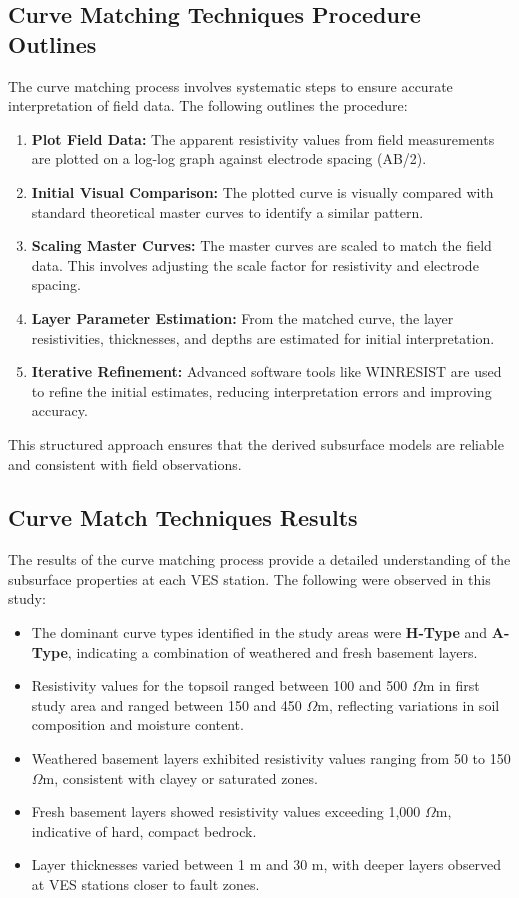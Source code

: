 \documentclass[12pt,a4paper]{report}
\begin{document}
\subsection{Curve Matching Techniques Procedure Outlines}

The curve matching process involves systematic steps to ensure accurate interpretation of field data. The following outlines the procedure:

\begin{enumerate}
    \item \textbf{Plot Field Data:} The apparent resistivity values from field measurements are plotted on a log-log graph against electrode spacing (AB/2).
    \item \textbf{Initial Visual Comparison:} The plotted curve is visually compared with standard theoretical master curves to identify a similar pattern.
    \item \textbf{Scaling Master Curves:} The master curves are scaled to match the field data. This involves adjusting the scale factor for resistivity and electrode spacing.
    \item \textbf{Layer Parameter Estimation:} From the matched curve, the layer resistivities, thicknesses, and depths are estimated for initial interpretation.
    \item \textbf{Iterative Refinement:} Advanced software tools like WINRESIST are used to refine the initial estimates, reducing interpretation errors and improving accuracy.
\end{enumerate}

This structured approach ensures that the derived subsurface models are reliable and consistent with field observations.

\subsection{Curve Match Techniques Results}
The results of the curve matching process provide a detailed understanding of the subsurface properties at each VES station. The following were observed in this study:

\begin{itemize}
    \item The dominant curve types identified in the study areas were \textbf{H-Type} and \textbf{A-Type}, indicating a combination of weathered and fresh basement layers.
    \item Resistivity values for the topsoil ranged between 100 and 500 $\Omega$m in first study area and ranged between 150 and 450 $\Omega$m, reflecting variations in soil composition and moisture content.
    \item Weathered basement layers exhibited resistivity values ranging from 50 to 150 $\Omega$m, consistent with clayey or saturated zones.
    \item Fresh basement layers showed resistivity values exceeding 1,000 $\Omega$m, indicative of hard, compact bedrock.
    \item Layer thicknesses varied between 1 m and 30 m, with deeper layers observed at VES stations closer to fault zones.
\end{itemize}
\end{document}
